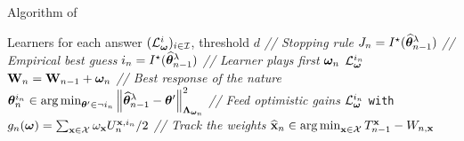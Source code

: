 \begin{algorithm}[ht]
\centering
\caption{Algorithm of \LG{}}
\label{alg:lg}
\begin{algorithmic}[1]
     Learners for each answer $(\mathcal{L}^i_{\boldsymbol \omega})_{i\in\mathcal{I}}$, threshold $d$
        \State \textit{// Stopping rule}
            \State {} 
             $J_n = I^\star(\widehat{{\boldsymbol \theta}}_{n-1}^\lambda)$
        \EndIf
        \State \textit{// Empirical best guess}
        \State $i_n = I^\star(\widehat{{\boldsymbol \theta}}_{n-1}^\lambda)$
        \State \textit{// Learner plays first}
        \State {} ${\boldsymbol \omega}_n$  $\mathcal{L}^{i_n}_{\boldsymbol \omega}$
        \State {} ${\bf W}_n={\bf W}_{n-1}+{\boldsymbol \omega}_n$
        \State \textit{// Best response of the nature}
        \State ${\boldsymbol \theta}_n^{i_n} \in \operatorname*{arg\,min}_{{\boldsymbol \theta}'\in\neg i_n}\left\lVert\widehat{{\boldsymbol \theta}}_{n-1}^\lambda-{\boldsymbol \theta}'\right\rVert^2_{{\boldsymbol \Lambda}_{{\boldsymbol \omega}_n}}$
        \State \textit{// Feed optimistic gains}
        \State {} $\mathcal{L}_{\boldsymbol \omega}^{i_n}$ \texttt{with} $g_{n}({\boldsymbol \omega}) = \sum_{{\bf x}\in\mathcal{X}}\omega_{\bf x} U_n^{{\bf x},i_n}/2$
        \State \textit{// Track the weights}
        \State {} $\widehat{{\bf x}}_n \in \operatorname*{arg\,min}_{{\bf x}\in \mathcal{X}} T_{n-1}^{{\bf x}} - W_{n,{\bf x}}$
   \EndFor
\end{algorithmic}
\end{algorithm}


